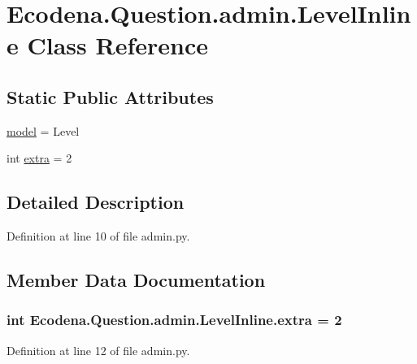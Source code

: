 \hypertarget{class_ecodena_1_1_question_1_1admin_1_1_level_inline}{
\section{Ecodena.Question.admin.LevelInline Class Reference}
\label{d9/d52/class_ecodena_1_1_question_1_1admin_1_1_level_inline}
}
\subsection*{Static Public Attributes}
\begin{DoxyCompactItemize}
\item 
\hyperlink{class_ecodena_1_1_question_1_1admin_1_1_level_inline_aeb7bcac143814e9a798564ec87de147d}{model} = Level
\item 
int \hyperlink{class_ecodena_1_1_question_1_1admin_1_1_level_inline_a66131b956e410b1976261ff35b1fc918}{extra} = 2
\end{DoxyCompactItemize}


\subsection{Detailed Description}


Definition at line 10 of file admin.py.



\subsection{Member Data Documentation}
\hypertarget{class_ecodena_1_1_question_1_1admin_1_1_level_inline_a66131b956e410b1976261ff35b1fc918}{
\subsubsection[{extra}]{\setlength{\rightskip}{0pt plus 5cm}int {\bf Ecodena.Question.admin.LevelInline.extra} = 2}}
\label{d9/d52/class_ecodena_1_1_question_1_1admin_1_1_level_inline_a66131b956e410b1976261ff35b1fc918}


Definition at line 12 of file admin.py.

